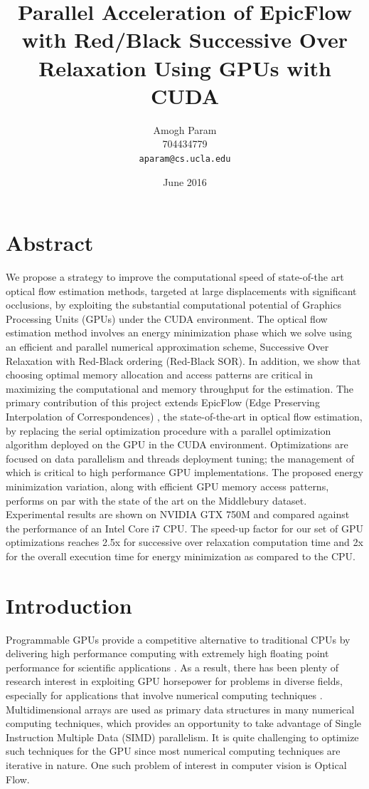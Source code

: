\documentclass[english]{article}
\title{Parallel Acceleration of EpicFlow with Red/Black Successive Over Relaxation Using GPUs with CUDA}
\author{
  Amogh Param\\
  704434779\\
  \texttt{aparam@cs.ucla.edu}
}
\date{June 2016}
\begin{document}
    \maketitle
     
	\section*{Abstract}  
	We propose a strategy to improve the computational speed of state-of-the art optical flow estimation methods, targeted at large displacements with significant occlusions, by exploiting the substantial computational potential of Graphics Processing Units (GPUs) under the CUDA environment. The optical flow estimation method involves an energy minimization phase which we solve using an efficient and parallel numerical approximation scheme, Successive Over Relaxation with Red-Black ordering (Red-Black SOR). In addition, we show that choosing optimal memory allocation and access patterns are critical in maximizing the computational and memory throughput for the estimation. The primary contribution of this project extends  EpicFlow (Edge Preserving Interpolation of Correspondences) \cite{1}, the state-of-the-art in optical flow estimation, by replacing the serial optimization procedure with a parallel optimization algorithm deployed on the GPU in the CUDA environment. Optimizations are focused on data parallelism and threads deployment tuning; the management of which is critical to high performance GPU implementations. The proposed energy minimization variation, along with efficient GPU memory access patterns, performs on par with the state of the art on the Middlebury dataset. Experimental results are shown on NVIDIA GTX 750M and compared against the performance of an Intel Core i7 CPU. The speed-up factor for our set of GPU optimizations reaches 2.5x for successive over relaxation computation time and 2x for the overall execution time for energy minimization as compared to the CPU.

    \section{Introduction}
	Programmable GPUs provide a competitive alternative to traditional CPUs by delivering high performance computing with extremely high floating point performance for scientific applications \cite{6}. As a result, there has been plenty of research interest in exploiting GPU horsepower for problems in diverse fields, especially for applications that involve numerical computing techniques \cite{7}. Multidimensional arrays are used as primary data structures in many numerical computing techniques, which provides an opportunity to take advantage of Single Instruction Multiple Data (SIMD) parallelism. It is quite challenging to optimize such techniques for the GPU since most numerical computing techniques are iterative in nature. One such problem of interest in computer vision is Optical Flow.\newline
\end{document}
